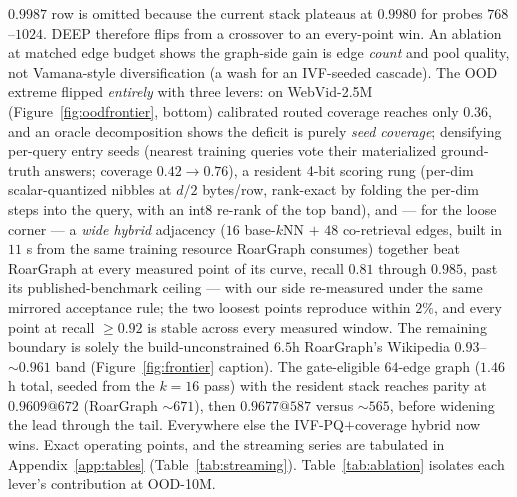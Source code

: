 \documentclass{article}
\begin{document}
$0.9987$ row is omitted because the current stack plateaus at $0.9980$ for
probes $768$--$1024$.
DEEP therefore flips from a crossover to an every-point win. An ablation at matched edge budget shows the graph-side gain is
edge \emph{count} and pool quality, not Vamana-style diversification (a wash for an
IVF-seeded cascade). The OOD extreme flipped \emph{entirely} with three levers: on
WebVid-2.5M (Figure~\ref{fig:oodfrontier}, bottom) calibrated routed coverage reaches
only $0.36$, and an oracle decomposition shows the deficit is purely \emph{seed
coverage}; densifying per-query entry seeds (nearest training queries vote their
materialized ground-truth answers; coverage $0.42\to0.76$), a resident 4-bit scoring
rung (per-dim scalar-quantized nibbles at $d/2$ bytes/row, rank-exact by folding the
per-dim steps into the query, with an int8 re-rank of the top band), and --- for the
loose corner --- a \emph{wide hybrid} adjacency ($16$ base-$k$NN $+$ $48$
co-retrieval edges, built in $11$ s from the same training resource RoarGraph
consumes) together beat RoarGraph at every measured point of its curve, recall
$0.81$ through $0.985$, past its published-benchmark ceiling --- with our side
re-measured under the same mirrored acceptance rule; the two loosest points
reproduce within $2\%$, and every point at recall ${\ge}0.92$ is stable across
every measured window. The remaining boundary is solely the
build-unconstrained $6.5$h RoarGraph's Wikipedia
$0.93$--${\sim}0.961$ band (Figure~\ref{fig:frontier} caption).  The
gate-eligible $64$-edge graph ($1.46$ h total, seeded from the $k{=}16$ pass)
with the resident stack reaches parity at $0.9609@672$ (RoarGraph
${\sim}671$), then $0.9677@587$ versus ${\sim}565$, before widening the lead
through the tail.
Everywhere else the IVF-PQ$+$coverage hybrid now wins.
Exact operating points,
and the streaming series are tabulated in Appendix~\ref{app:tables} (Table~\ref{tab:streaming}).
Table~\ref{tab:ablation} isolates each lever's contribution at OOD-10M.
\end{document}
